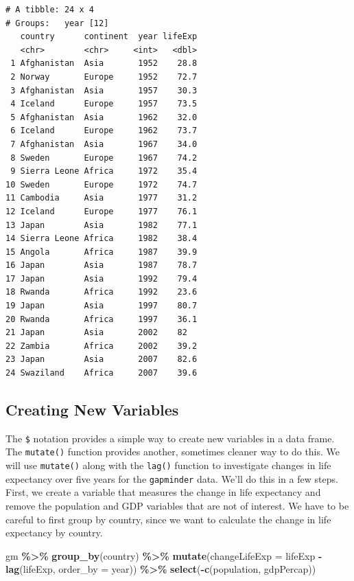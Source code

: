 \documentclass[
]{krantz}
\makeatletter
\newenvironment{Shaded}{\begin{snugshade}}{\end{snugshade}}
\newcommand{\DataTypeTok}[1]{\textcolor[rgb]{0.27,0.27,0.27}{#1}}
\newcommand{\KeywordTok}[1]{\textcolor[rgb]{0.27,0.27,0.27}{\textbf{#1}}}
\newcommand{\NormalTok}[1]{#1}
\newcommand{\OperatorTok}[1]{\textcolor[rgb]{0.43,0.43,0.43}{\textbf{#1}}}
\newcommand{\StringTok}[1]{\textcolor[rgb]{0.5,0.5,0.5}{#1}}
\newenvironment{kframe}{%
\medskip{}
\setlength{\fboxsep}{.8em}
 \def\at@end@of@kframe{}%
 \ifinner\ifhmode%
  \def\at@end@of@kframe{\end{minipage}}%
  \begin{minipage}{\columnwidth}%
 \fi\fi%
 \def\FrameCommand##1{\hskip\@totalleftmargin \hskip-\fboxsep
 \colorbox{shadecolor}{##1}\hskip-\fboxsep
     \hskip-\linewidth \hskip-\@totalleftmargin \hskip\columnwidth}%
 \MakeFramed {\advance\hsize-\width
   \@totalleftmargin\z@ \linewidth\hsize
   \@setminipage}}%
 {\par\unskip\endMakeFramed%
 \at@end@of@kframe}
\renewenvironment{Shaded}{\begin{kframe}}{\end{kframe}}
\makeatother
\begin{document}
\begin{verbatim}
# A tibble: 24 x 4
# Groups:   year [12]
   country      continent  year lifeExp
   <chr>        <chr>     <int>   <dbl>
 1 Afghanistan  Asia       1952    28.8
 2 Norway       Europe     1952    72.7
 3 Afghanistan  Asia       1957    30.3
 4 Iceland      Europe     1957    73.5
 5 Afghanistan  Asia       1962    32.0
 6 Iceland      Europe     1962    73.7
 7 Afghanistan  Asia       1967    34.0
 8 Sweden       Europe     1967    74.2
 9 Sierra Leone Africa     1972    35.4
10 Sweden       Europe     1972    74.7
11 Cambodia     Asia       1977    31.2
12 Iceland      Europe     1977    76.1
13 Japan        Asia       1982    77.1
14 Sierra Leone Africa     1982    38.4
15 Angola       Africa     1987    39.9
16 Japan        Asia       1987    78.7
17 Japan        Asia       1992    79.4
18 Rwanda       Africa     1992    23.6
19 Japan        Asia       1997    80.7
20 Rwanda       Africa     1997    36.1
21 Japan        Asia       2002    82  
22 Zambia       Africa     2002    39.2
23 Japan        Asia       2007    82.6
24 Swaziland    Africa     2007    39.6
\end{verbatim}

\hypertarget{creating-new-variables}{%
\subsection{Creating New Variables}\label{creating-new-variables}}

The \texttt{\$} notation provides a simple way to create new variables in a data frame. The \texttt{mutate()} function provides another, sometimes cleaner way to do this. We will use \texttt{mutate()} along with the \texttt{lag()} function to investigate changes in life expectancy over five years for the \texttt{gapminder} data. We'll do this in a few steps. First, we create a variable that measures the change in life expectancy and remove the population and GDP variables that are not of interest. We have to be careful to first group by country, since we want to calculate the change in life expectancy by country.

\begin{Shaded}
\begin{Highlighting}[]
\NormalTok{gm }\OperatorTok{\%\textgreater{}\%}\StringTok{ }
\StringTok{  }\KeywordTok{group\_by}\NormalTok{(country) }\OperatorTok{\%\textgreater{}\%}\StringTok{ }
\StringTok{  }\KeywordTok{mutate}\NormalTok{(}\DataTypeTok{changeLifeExp =}\NormalTok{ lifeExp }\OperatorTok{{-}}\StringTok{ }\KeywordTok{lag}\NormalTok{(lifeExp, }\DataTypeTok{order\_by =}\NormalTok{ year)) }\OperatorTok{\%\textgreater{}\%}\StringTok{ }
\StringTok{  }\KeywordTok{select}\NormalTok{(}\OperatorTok{{-}}\KeywordTok{c}\NormalTok{(population, gdpPercap))}
\end{Highlighting}
\end{Shaded}
\end{document}
